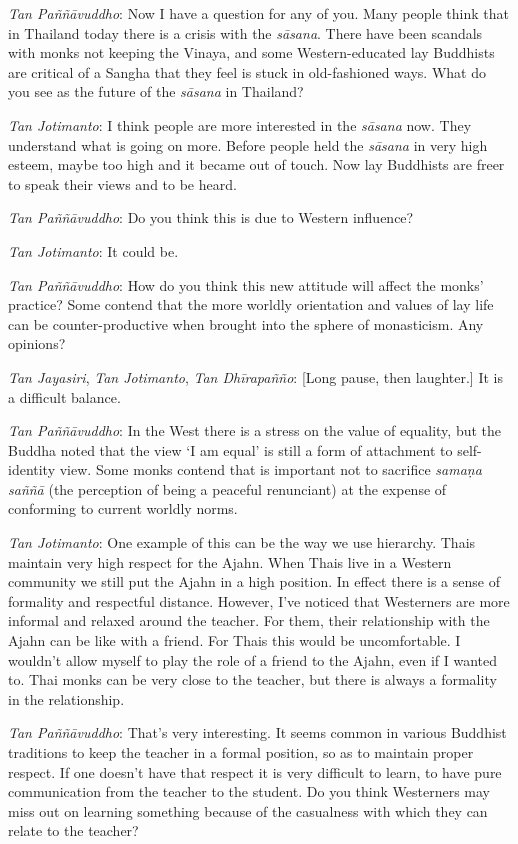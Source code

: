 \emph{Tan Paññāvuddho}: Now I have a question for any of you. Many
people think that in Thailand today there is a crisis with the
\emph{sāsana}. There have been scandals with monks not keeping the
Vinaya, and some Western-educated lay Buddhists are critical of a Sangha
that they feel is stuck in old-fashioned ways. What do you see as the
future of the \emph{sāsana} in Thailand? 

\emph{Tan Jotimanto}: I think people are more interested in the
\emph{sāsana} now. They understand what is going on more. Before people
held the \emph{sāsana} in very high esteem, maybe too high and it became
out of touch. Now lay Buddhists are freer to speak their views and to be
heard. 

\emph{Tan Paññāvuddho}: Do you think this is due to Western influence? 

\emph{Tan Jotimanto}: It could be. 

\emph{Tan Paññāvuddho}: How do you think this new attitude will affect
the monks' practice? Some contend that the more worldly orientation and
values of lay life can be counter-productive when brought into the
sphere of monasticism. Any opinions? 

\emph{Tan Jayasiri}, \emph{Tan Jotimanto}, \emph{Tan Dhīrapañño}:
[Long pause, then laughter.] It is a difficult balance.

\emph{Tan Paññāvuddho}: In the West there is a stress on the value of
equality, but the Buddha noted that the view `I am equal' is still a
form of attachment to self-identity view. Some monks contend that is
important not to sacrifice \emph{samaṇa saññā} (the perception of being
a peaceful renunciant) at the expense of conforming to current worldly
norms. 

\emph{Tan Jotimanto}: One example of this can be the way we use
hierarchy. Thais maintain very high respect for the Ajahn. When Thais
live in a Western community we still put the Ajahn in a high position. 
In effect there is a sense of formality and respectful distance. 
However, I've noticed that Westerners are more informal and relaxed
around the teacher. For them, their relationship with the Ajahn can be
like with a friend. For Thais this would be uncomfortable. I wouldn't
allow myself to play the role of a friend to the Ajahn, even if I wanted
to. Thai monks can be very close to the teacher, but there is always a
formality in the relationship. 

\emph{Tan Paññāvuddho}: That's very interesting. It seems common in
various Buddhist traditions to keep the teacher in a formal position, so
as to maintain proper respect. If one doesn't have that respect it is
very difficult to learn, to have pure communication from the teacher to
the student. Do you think Westerners may miss out on learning something
because of the casualness with which they can relate to the teacher? 

